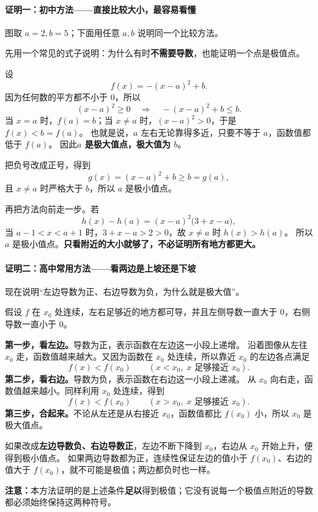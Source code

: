 \clearpage
\begin{proofbox}
\paragraph{证明一：初中方法——直接比较大小，最容易看懂}
\begin{center}\end{center}
图取 $a=2,b=5$；下面用任意 $a,b$ 说明同一个比较方法。

先用一个常见的式子说明：为什么有时\textbf{不需要导数}，也能证明一个点是极值点。

设
\[
f(x)=-(x-a)^2+b.
\]
因为任何数的平方都不小于 $0$，所以
\[
(x-a)^2\ge0\quad\Longrightarrow\quad -(x-a)^2+b\le b.
\]
当 $x=a$ 时，$f(a)=b$；当 $x\ne a$ 时，$(x-a)^2>0$，于是 $f(x)<b=f(a)$。
也就是说，$a$ 左右无论靠得多近，只要不等于 $a$，函数值都低于 $f(a)$。
因此\textbf{$a$ 是极大值点，极大值为 $b$}。

把负号改成正号，得到
\[
g(x)=(x-a)^2+b\ge b=g(a),
\]
且 $x\ne a$ 时严格大于 $b$，所以 $a$ 是极小值点。

再把方法向前走一步。若
\[
h(x)-h(a)=(x-a)^2\bigl(3+x-a\bigr),
\]
当 $a-1<x<a+1$ 时，$3+x-a>2>0$，故 $x\ne a$ 时 $h(x)>h(a)$。
所以 $a$ 是极小值点。\textbf{只看附近的大小就够了，不必证明所有地方都更大。}

\end{proofbox}
\clearpage
\begin{proofbox}
\paragraph{证明二：高中常用方法——看两边是上坡还是下坡}
\begin{center}\end{center}

现在说明“左边导数为正、右边导数为负，为什么就是极大值”。

假设 $f$ 在 $x_0$ 处连续，左右足够近的地方都可导，并且左侧导数一直大于 $0$，右侧导数一直小于 $0$。

\textbf{第一步，看左边。}导数为正，表示函数在左边这一小段上递增。
沿着图像从左往 $x_0$ 走，函数值越来越大。又因为函数在 $x_0$ 处连续，所以靠近 $x_0$ 的左边各点满足
\[
f(x)<f(x_0)\qquad (x<x_0,\;x\text{ 足够接近 }x_0).
\]
\textbf{第二步，看右边。}导数为负，表示函数在右边这一小段上递减。
从 $x_0$ 向右走，函数值越来越小。同样利用 $x_0$ 处连续，得到
\[
f(x)<f(x_0)\qquad (x>x_0,\;x\text{ 足够接近 }x_0).
\]
\textbf{第三步，合起来。}不论从左还是从右接近 $x_0$，函数值都比 $f(x_0)$ 小，所以 $x_0$ 是极大值点。

如果改成\textbf{左边导数负、右边导数正}，左边不断下降到 $x_0$，右边从 $x_0$ 开始上升，便得到极小值点。
如果两边导数都为正，连续性保证左边的值小于 $f(x_0)$、右边的值大于 $f(x_0)$，就不可能是极值；两边都负时也一样。

\textbf{注意：}本方法证明的是上述条件\textbf{足以}得到极值；它没有说每一个极值点附近的导数都必须始终保持这两种符号。

\end{proofbox}
